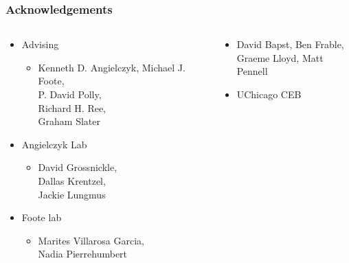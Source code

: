 \documentclass{beamer}
\begin{document}
\begin{frame}
  \frametitle{Acknowledgements}
  \begin{columns}
    \begin{column}{0.5\textwidth}
      \begin{itemize}
        \item Advising
          \begin{itemize}
            \item Kenneth D. Angielczyk, Michael J. Foote, \\P. David Polly, \\Richard H. Ree, \\Graham Slater
          \end{itemize}
        \item Angielczyk Lab
          \begin{itemize}
            \item {\small{David Grossnickle, \\Dallas Krentzel, \\Jackie Lungmus}}
          \end{itemize}
        \item Foote lab
          \begin{itemize}
            \item {\small{Marites Villarosa Garcia, \\Nadia Pierrehumbert}}
          \end{itemize}
      \end{itemize}
    \end{column}
    \begin{column}{0.5\textwidth}
      \begin{itemize}
        \item {\footnotesize{David Bapst, Ben Frable, \\Graeme Lloyd, Matt Pennell}}
        \item {\footnotesize{UChicago CEB}}
      \end{itemize}


\end{column}
\end{columns}
\end{frame}
\end{document}
